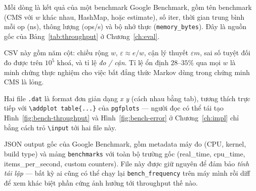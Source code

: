 \noindent Mỗi dòng là kết quả của một benchmark Google Benchmark, gồm tên
benchmark (CMS với $w$ khác nhau, HashMap, hoặc estimate), số iter, thời gian
trung bình mỗi op (ns), thông lượng (ops/s) và bộ nhớ thực
(\texttt{memory\_bytes}). Đây là nguồn gốc của Bảng~\ref{tab:throughput} ở
Chương~\ref{ch:eval}.



\noindent CSV này gồm năm cột: chiều rộng $w$, $\varepsilon \approx e/w$, cận
lý thuyết $\varepsilon m$, sai số tuyệt đối đo được trên $10^5$ khoá, và tỉ lệ
\textit{đo / cận}. Tỉ lệ ổn định $28$--$35\%$ qua mọi $w$ là minh chứng thực
nghiệm cho việc bất đẳng thức Markov dùng trong chứng minh CMS là lỏng.





\noindent Hai file \texttt{.dat} là format đơn giản dạng \emph{x y} (cách
nhau bằng tab), tương thích trực tiếp với \texttt{\textbackslash addplot
table\{...\}} của \texttt{pgfplots} --- người đọc có thể tái tạo
Hình~\ref{fig:bench-throughput} và Hình~\ref{fig:bench-error} ở
Chương~\ref{ch:impl} chỉ bằng cách trỏ \texttt{\textbackslash input} tới
hai file này.



\noindent JSON output gốc của Google Benchmark, gồm metadata máy đo
(CPU, kernel, build type) và mảng \texttt{benchmarks} với toàn bộ trường gốc
(real\_time, cpu\_time, items\_per\_second, custom counters). File này được
giữ nguyên để đảm bảo \emph{tính tái lập} --- bất kỳ ai cũng có thể chạy lại
\texttt{bench\_frequency} trên máy mình rồi diff để xem khác biệt phần cứng
ảnh hưởng tới throughput thế nào.
